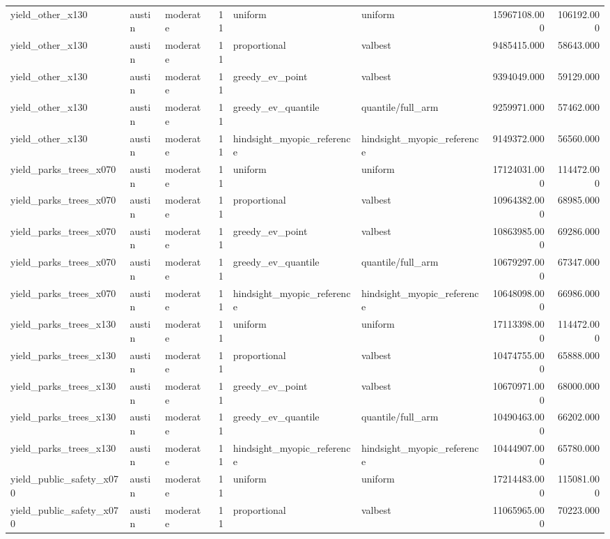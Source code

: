 \begin{tabular}{lllrllrr}
yield\_other\_x130 & austin & moderate & 11 & uniform & uniform & 15967108.000 & 106192.000 \\
yield\_other\_x130 & austin & moderate & 11 & proportional & valbest & 9485415.000 & 58643.000 \\
yield\_other\_x130 & austin & moderate & 11 & greedy\_ev\_point & valbest & 9394049.000 & 59129.000 \\
yield\_other\_x130 & austin & moderate & 11 & greedy\_ev\_quantile & quantile/full\_arm & 9259971.000 & 57462.000 \\
yield\_other\_x130 & austin & moderate & 11 & hindsight\_myopic\_reference & hindsight\_myopic\_reference & 9149372.000 & 56560.000 \\
yield\_parks\_trees\_x070 & austin & moderate & 11 & uniform & uniform & 17124031.000 & 114472.000 \\
yield\_parks\_trees\_x070 & austin & moderate & 11 & proportional & valbest & 10964382.000 & 68985.000 \\
yield\_parks\_trees\_x070 & austin & moderate & 11 & greedy\_ev\_point & valbest & 10863985.000 & 69286.000 \\
yield\_parks\_trees\_x070 & austin & moderate & 11 & greedy\_ev\_quantile & quantile/full\_arm & 10679297.000 & 67347.000 \\
yield\_parks\_trees\_x070 & austin & moderate & 11 & hindsight\_myopic\_reference & hindsight\_myopic\_reference & 10648098.000 & 66986.000 \\
yield\_parks\_trees\_x130 & austin & moderate & 11 & uniform & uniform & 17113398.000 & 114472.000 \\
yield\_parks\_trees\_x130 & austin & moderate & 11 & proportional & valbest & 10474755.000 & 65888.000 \\
yield\_parks\_trees\_x130 & austin & moderate & 11 & greedy\_ev\_point & valbest & 10670971.000 & 68000.000 \\
yield\_parks\_trees\_x130 & austin & moderate & 11 & greedy\_ev\_quantile & quantile/full\_arm & 10490463.000 & 66202.000 \\
yield\_parks\_trees\_x130 & austin & moderate & 11 & hindsight\_myopic\_reference & hindsight\_myopic\_reference & 10444907.000 & 65780.000 \\
yield\_public\_safety\_x070 & austin & moderate & 11 & uniform & uniform & 17214483.000 & 115081.000 \\
yield\_public\_safety\_x070 & austin & moderate & 11 & proportional & valbest & 11065965.000 & 70223.000 \\

\end{tabular}
